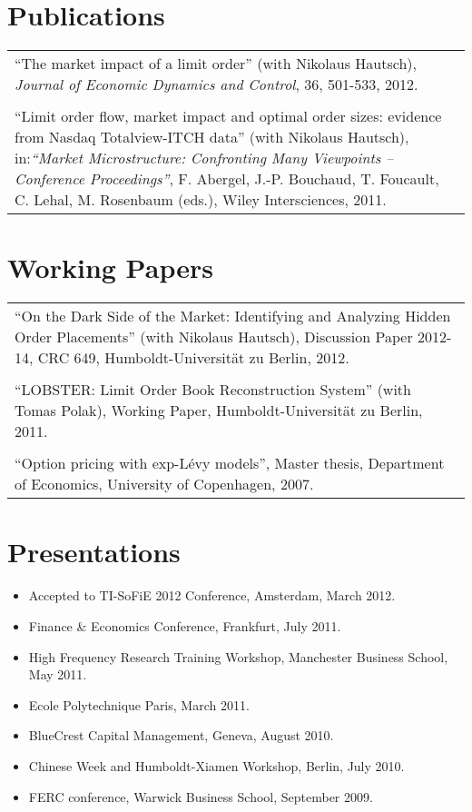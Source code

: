 \documentclass[a4paper,11pt]{article}
\begin{document}
\section*{Publications}
\noindent\hspace{20pt}
\begin{tabular}[h]{p{\textwidth}}
``The market impact of a limit order'' (with Nikolaus Hautsch), \emph{Journal of Economic Dynamics and Control}, 36, 501-533, 2012.\\
\\
``Limit order flow, market impact and optimal order sizes: evidence from Nasdaq Totalview-ITCH data'' (with Nikolaus Hautsch), in:\emph{``Market Microstructure: Confronting Many Viewpoints -- Conference Proceedings''}, F. Abergel, J.-P. Bouchaud, T. Foucault, C. Lehal, M. Rosenbaum (eds.), Wiley Intersciences, 2011.
\end{tabular}
\section*{Working Papers}
\noindent\hspace{20pt}
\begin{tabular}[h]{p{\textwidth}}
  ``On the Dark Side of the Market: Identifying and Analyzing Hidden Order Placements'' (with Nikolaus Hautsch), Discussion Paper 2012-14, CRC 649, Humboldt-Universit\"at zu Berlin, 2012.\\ 
\\
``LOBSTER: Limit Order Book Reconstruction System'' (with Tomas Polak), Working Paper, Humboldt-Universit\"at zu Berlin, 2011.\\ 
\\
``Option pricing with exp-L\'evy models'', Master thesis, Department of Economics, University of Copenhagen, 2007.
\end{tabular}
\section*{Presentations}
\begin{itemize}
  \item Accepted to TI-SoFiE 2012 Conference, Amsterdam, March 2012.
  \item Finance \& Economics Conference, Frankfurt, July 2011.
  \item High Frequency Research Training Workshop, Manchester Business School, May 2011.
  \item Ecole Polytechnique Paris, March 2011.
  \item BlueCrest Capital Management, Geneva, August 2010.
  \item Chinese Week and Humboldt-Xiamen Workshop, Berlin, July 2010.
  \item FERC conference, Warwick Business School, September 2009.
\end{itemize}
\end{document}

